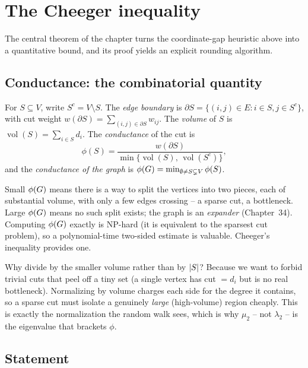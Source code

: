 \section{The Cheeger inequality}
\label{ch32:cheeger}

The central theorem of the chapter turns the coordinate-gap heuristic above into a quantitative bound, and its proof yields an explicit rounding algorithm.

\subsection{Conductance: the combinatorial quantity}

\begin{definition}
\label{ch32:conductance}
For $S\subseteq V$, write $S^c=V\setminus S$. The \emph{edge boundary} is $\partial S=\{(i,j)\in E : i\in S, j\in S^c\}$, with cut weight $w(\partial S)=\sum_{(i,j)\in\partial S}w_{ij}$. The \emph{volume} of $S$ is $\operatorname{vol}(S)=\sum_{i\in S}d_i$. The \emph{conductance} of the cut is
\[
  \phi(S)=\frac{w(\partial S)}{\min\{\operatorname{vol}(S),\,\operatorname{vol}(S^c)\}},
\]
and the \emph{conductance of the graph} is $\phi(G)=\min_{\emptyset\ne S\subsetneq V}\phi(S)$.
\end{definition}

Small $\phi(G)$ means there is a way to split the vertices into two pieces, each of substantial volume, with only a few edges crossing -- a sparse cut, a bottleneck. Large $\phi(G)$ means no such split exists; the graph is an \emph{expander} (Chapter~34). Computing $\phi(G)$ exactly is NP-hard (it is equivalent to the sparsest cut problem), so a polynomial-time two-sided estimate is valuable. Cheeger's inequality provides one.

\begin{intuitionbox}
Why divide by the smaller volume rather than by $\lvert S\rvert$? Because we want to forbid trivial cuts that peel off a tiny set (a single vertex has cut $=d_i$ but is no real bottleneck). Normalizing by volume charges each side for the degree it contains, so a sparse cut must isolate a genuinely \emph{large} (high-volume) region cheaply. This is exactly the normalization the random walk sees, which is why $\mu_2$ -- not $\lambda_2$ -- is the eigenvalue that brackets $\phi$.
\end{intuitionbox}

\subsection{Statement}

